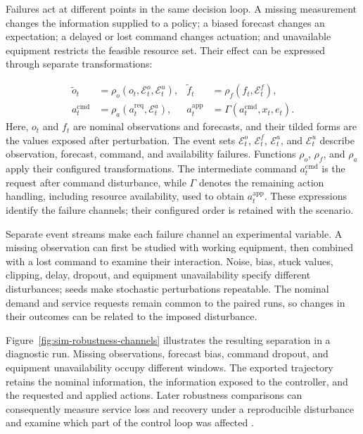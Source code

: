 Failures act at different points in the same decision loop. A missing measurement changes the information supplied to a policy; a biased forecast changes an expectation; a delayed or lost command changes actuation; and unavailable equipment restricts the feasible resource set. Their effect can be expressed through separate transformations:
\begin{samepage}
\begin{equation}
\begin{aligned}
\tilde{o}_t&=\rho_o(o_t,\mathcal{E}^{o}_t,\mathcal{E}^{u}_t),&
\tilde{f}_t&=\rho_f(f_t,\mathcal{E}^{f}_t),\\
a_t^{\mathrm{cmd}}&=\rho_a(a_t^{\mathrm{req}},\mathcal{E}^{a}_t),&
a_t^{\mathrm{app}}&=\Gamma(a_t^{\mathrm{cmd}},x_t,e_t).
\end{aligned}
\label{eq:sim-robustness-channels}
\end{equation}
Here, $o_t$ and $f_t$ are nominal observations and forecasts, and their tilded forms are the values exposed after perturbation. The event sets $\mathcal{E}^{o}_t$, $\mathcal{E}^{f}_t$, $\mathcal{E}^{a}_t$, and $\mathcal{E}^{u}_t$ describe observation, forecast, command, and availability failures. Functions $\rho_o$, $\rho_f$, and $\rho_a$ apply their configured transformations. The intermediate command $a_t^{\mathrm{cmd}}$ is the request after command disturbance, while $\Gamma$ denotes the remaining action handling, including resource availability, used to obtain $a_t^{\mathrm{app}}$. These expressions identify the failure channels; their configured order is retained with the scenario.\par
\end{samepage}

Separate event streams make each failure channel an experimental variable. A missing observation can first be studied with working equipment, then combined with a lost command to examine their interaction. Noise, bias, stuck values, clipping, delay, dropout, and equipment unavailability specify different disturbances; seeds make stochastic perturbations repeatable. The nominal demand and service requests remain common to the paired runs, so changes in their outcomes can be related to the imposed disturbance.

Figure~\ref{fig:sim-robustness-channels} illustrates the resulting separation in a diagnostic run. Missing observations, forecast bias, command dropout, and equipment unavailability occupy different windows. The exported trajectory retains the nominal information, the information exposed to the controller, and the requested and applied actions. Later robustness comparisons can consequently measure service loss and recovery under a reproducible disturbance and examine which part of the control loop was affected \parencite{fonseca2026citylearnv3}.

